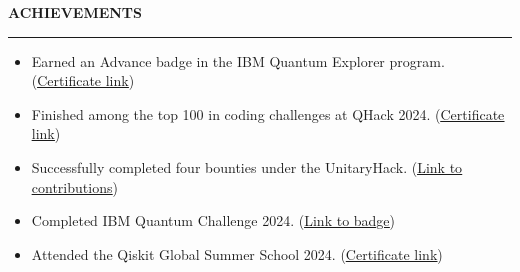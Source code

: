 \documentclass[a4paper,10pt]{article}
\let\oldhref\href
\renewcommand{\href}[2]{\oldhref{#1}{\uline{#2}}}
\newcommand{\cvHeaderOne}[1]{%
  \vspace*{1.5em}%
  {\noindent\large\textbf{\MakeUppercase{#1}}\par}%
  \noindent\rule{\linewidth}{0.4pt}%
  \vspace*{0.5em}%
}
\newenvironment{cvItemList}{%
  \begin{itemize}%
    \setlength{\itemsep}{0.1em}%
    \setlength{\topsep}{0em}%
    \setlength{\partopsep}{0em}%
    \setlength{\parsep}{0em}%
    \setlength{\parskip}{0em}%
}{%
  \end{itemize}%
}
\begin{document}
\cvHeaderOne{Achievements}
\begin{cvItemList}
\item Earned an Advance badge in the IBM Quantum Explorer program. (\href{https://www.credly.com/badges/28fb91b1-077d-45e3-8f1a-77a383ee392c/linked_in_profile}{Certificate link})  
\item Finished among the top 100 in coding challenges at QHack 2024. (\href{https://pennylane.ai/profile/tarun07?certificate=qhack-2024-coding-challenges-top-100}{Certificate link})  
\item Successfully completed four bounties under the UnitaryHack. (\href{https://unitaryhack.dev/hackers/tarun-kumar07/}{Link to contributions})  
\item Completed IBM Quantum Challenge 2024. (\href{https://www.credly.com/badges/5ab13c32-2ecf-42ab-ba84-e308deb7a511/linked_in_profile}{Link to badge})  
\item Attended the Qiskit Global Summer School 2024. (\href{https://www.credly.com/badges/6346a498-05fc-482f-9c56-25114b9bad2c/linked_in_profile}{Certificate link})
\end{cvItemList}
\end{document}

